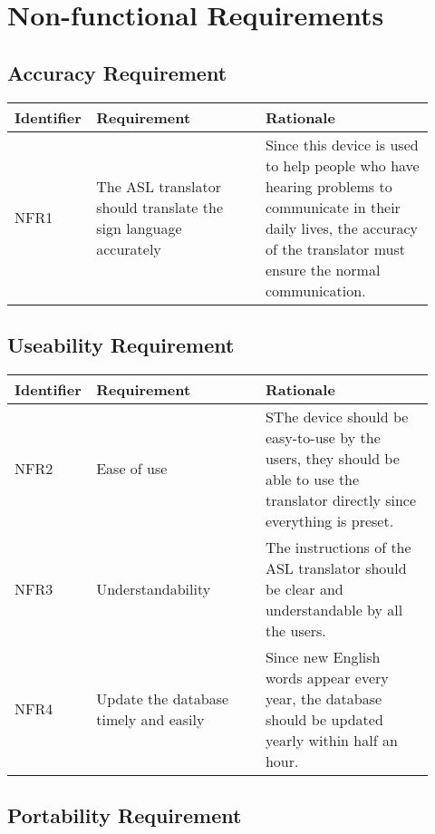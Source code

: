 \documentclass[12pt]{article}
\begin{document}
\section{Non-functional Requirements}
\subsection{Accuracy Requirement}

\renewcommand{\arraystretch}{1.2}
\noindent \begin{tabularx}{\textwidth}{p{0.12\linewidth}|p{0.4\linewidth}|p{0.4\linewidth}}
\toprule
\textbf{Identifier} & \textbf{Requirement} & \textbf{Rationale}\\
\midrule
NFR1
& The ASL translator should translate the sign language accurately 
& Since this device is used to help people who have hearing problems to communicate in their daily lives, the accuracy of the translator must ensure the normal communication.\\

\bottomrule
\end{tabularx}

\subsection{Useability Requirement}

\renewcommand{\arraystretch}{1.2}
\noindent \begin{tabularx}{\textwidth}{p{0.12\linewidth}|p{0.4\linewidth}|p{0.4\linewidth}}
\toprule
\textbf{Identifier} & \textbf{Requirement} & \textbf{Rationale}\\
\midrule
NFR2
& Ease of use 
& SThe device should be easy-to-use by the users, they should be able to use the translator directly since everything is preset.
\\
\hline
NFR3
& Understandability
& The instructions of the ASL translator should be clear and understandable by all the users.
 \\
\hline
NFR4
& Update the database timely and easily
& Since new English words appear every year, the database should be updated yearly within half an hour.\\

\bottomrule
\end{tabularx}

\subsection{Portability Requirement}
\end{document}
